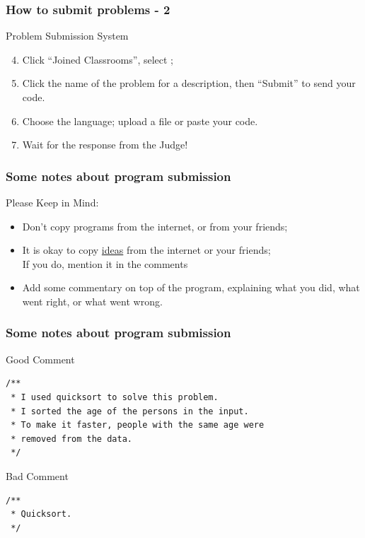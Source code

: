 \documentclass{beamer}
\begin{document}
\begin{frame}
  \frametitle{How to submit problems - 2}

  \begin{block}{Problem Submission System}
    \begin{enumerate}
      \setcounter{enumi}{3}
      \item Click ``Joined Classrooms'', select
        ;
      \item Click the name of the problem for a description, then ``Submit'' to send your code.
      \item Choose the language; upload a file or paste your code.
      \item Wait for the response from the Judge!
    \end{enumerate}
  \end{block}
\end{frame}

\begin{frame}
  \frametitle{Some notes about program submission}
  Please Keep in Mind:
  \medskip
  \begin{itemize}
  \item Don't copy programs from the internet, or from your friends;
  \item It is okay to copy \underline{ideas} from the internet or your friends;\\
    {\small If you do, mention it in the comments}
  \item Add some commentary on top of the program, explaining what you
    did, what went right, or what went wrong.    
  \end{itemize}
\end{frame}

\begin{frame}
  \frametitle{Some notes about program submission}
  \begin{block}{Good Comment}
{\small
\begin{verbatim}
/**
 * I used quicksort to solve this problem. 
 * I sorted the age of the persons in the input.
 * To make it faster, people with the same age were 
 * removed from the data.
 */
\end{verbatim}}
  \end{block}
  \begin{block}{Bad Comment}
{\small
\begin{verbatim}
/**
 * Quicksort.
 */
\end{verbatim}}
  \end{block}
\end{frame}
\end{document}
